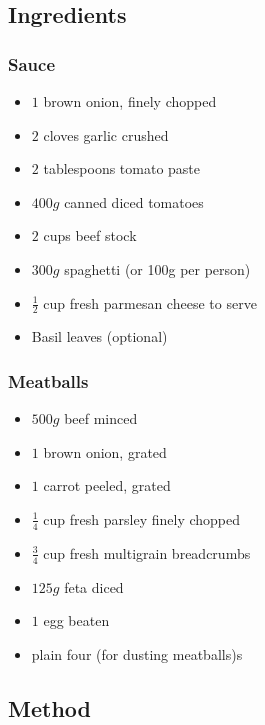\documentclass[11pt,a4paper]{article}
\begin{document}
\subsection*{Ingredients}

\begin{multicols}{2}

\subsubsection*{Sauce}

\begin{itemize}
  \item $1$ brown onion, finely chopped
  \item $2$ cloves garlic crushed
  \item $2$ tablespoons tomato paste
  \item $400g$ canned diced tomatoes
  \item $2$ cups beef stock
  \item $300g$ spaghetti (or 100g per person)
  \item $\frac{1}{2}$ cup fresh parmesan cheese to serve
  \item Basil leaves (optional)
\end{itemize}

\columnbreak

\subsubsection*{Meatballs}

\begin{itemize}
  \item $500g$ beef minced
  \item $1$ brown onion, grated
  \item $1$ carrot peeled, grated
  \item $\frac{1}{4}$ cup fresh parsley finely chopped
  \item $\frac{3}{4}$ cup fresh multigrain breadcrumbs
  \item $125g$ feta diced
  \item $1$ egg beaten
  \item plain four (for dusting meatballs)s
\end{itemize}

\end{multicols}

\medskip

\subsection*{Method}
\end{document}
